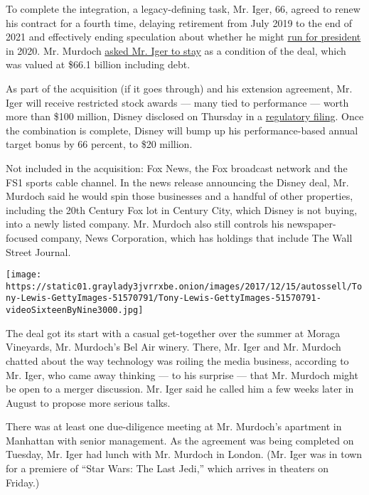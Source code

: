 To complete the integration, a legacy-defining task, Mr. Iger, 66,
agreed to renew his contract for a fourth time, delaying retirement from
July 2019 to the end of 2021 and effectively ending speculation about
whether he might
\href{https://www.nytimes3xbfgragh.onion/2017/10/08/business/media/for-disney-chief-robert-iger-an-unlikely-political-turn.html?_r=0}{run
for president} in 2020. Mr. Murdoch
\href{https://www.nytimes3xbfgragh.onion/2017/12/06/business/media/disney-fox-iger.html}{asked
Mr. Iger to stay} as a condition of the deal, which was valued at \$66.1
billion including debt.

As part of the acquisition (if it goes through) and his extension
agreement, Mr. Iger will receive restricted stock awards --- many tied
to performance --- worth more than \$100 million, Disney disclosed on
Thursday in a
\href{https://otp.tools.investis.com/clients/us/the_walt_disney_company/SEC/sec-show.aspx?Type=html\&FilingId=12429073\&CIK=0001001039\&Index=10000}{regulatory
filing}. Once the combination is complete, Disney will bump up his
performance-based annual target bonus by 66 percent, to \$20 million.

Not included in the acquisition: Fox News, the Fox broadcast network and
the FS1 sports cable channel. In the news release announcing the Disney
deal, Mr. Murdoch said he would spin those businesses and a handful of
other properties, including the 20th Century Fox lot in Century City,
which Disney is not buying, into a newly listed company. Mr. Murdoch
also still controls his newspaper-focused company, News Corporation,
which has holdings that include The Wall Street Journal.

\texttt{[image: https://static01.graylady3jvrrxbe.onion/images/2017/12/15/autossell/Tony-Lewis-GettyImages-51570791/Tony-Lewis-GettyImages-51570791-videoSixteenByNine3000.jpg]}

The deal got its start with a casual get-together over the summer at
Moraga Vineyards, Mr. Murdoch's Bel Air winery. There, Mr. Iger and Mr.
Murdoch chatted about the way technology was roiling the media business,
according to Mr. Iger, who came away thinking --- to his surprise ---
that Mr. Murdoch might be open to a merger discussion. Mr. Iger said he
called him a few weeks later in August to propose more serious talks.

There was at least one due-diligence meeting at Mr. Murdoch's apartment
in Manhattan with senior management. As the agreement was being
completed on Tuesday, Mr. Iger had lunch with Mr. Murdoch in London.
(Mr. Iger was in town for a premiere of ``Star Wars: The Last Jedi,''
which arrives in theaters on Friday.)

